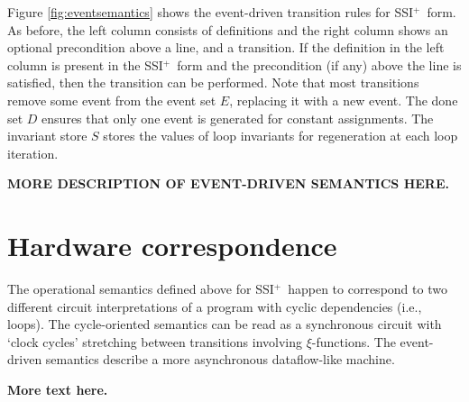 \documentclass[12pt,notitlepage,twoside]{article}
\newcommand{\xifunction}{$\xi$-function}
\newcommand{\ssiplus}{SSI$^+$}
\begin{document}
Figure \ref{fig:eventsemantics} shows the event-driven transition
rules for \ssiplus\ form.  As before, the left column consists of
definitions and the right column shows an optional precondition above
a line, and a transition.  If the definition in the left column is
present in the \ssiplus\ form and the precondition (if any) above the
line is satisfied, then the transition can be performed.  Note that
most transitions remove some event from the event set $E$, replacing
it with a new event.  The done set $D$ ensures that only one event is
generated for constant assignments.  The invariant store $S$ stores
the values of loop invariants for regeneration at each loop iteration.

\textbf{MORE DESCRIPTION OF EVENT-DRIVEN SEMANTICS HERE.}

\section{Hardware correspondence}

The operational semantics defined above for \ssiplus\ happen to
correspond to two different circuit interpretations of a program with
cyclic dependencies (i.e., loops).  The cycle-oriented semantics can
be read as a synchronous circuit with `clock cycles' stretching
between transitions involving \xifunction{s}.  The event-driven
semantics describe a more asynchronous dataflow-like machine.

\textbf{More text here.}


\appendix
\end{document}
